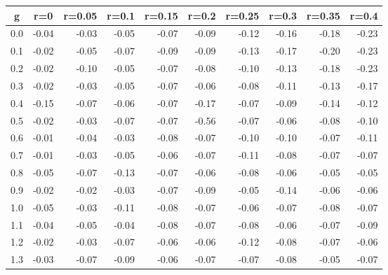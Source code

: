 %
\begin{table}[!tbp]
 \begin{center}
 \begin{tabular}{rrrrrrrrrr}\hline\hline
\multicolumn{1}{c}{g}&\multicolumn{1}{c}{r=0}&\multicolumn{1}{c}{r=0.05}&\multicolumn{1}{c}{r=0.1}&\multicolumn{1}{c}{r=0.15}&\multicolumn{1}{c}{r=0.2}&\multicolumn{1}{c}{r=0.25}&\multicolumn{1}{c}{r=0.3}&\multicolumn{1}{c}{r=0.35}&\multicolumn{1}{c}{r=0.4}\tabularnewline
\hline
0.0&-0.04&-0.03&-0.05&-0.07&-0.09&-0.12&-0.16&-0.18&-0.23\tabularnewline
0.1&-0.02&-0.05&-0.07&-0.09&-0.09&-0.13&-0.17&-0.20&-0.23\tabularnewline
0.2&-0.02&-0.10&-0.05&-0.07&-0.08&-0.10&-0.13&-0.18&-0.23\tabularnewline
0.3&-0.02&-0.03&-0.05&-0.07&-0.06&-0.08&-0.11&-0.13&-0.17\tabularnewline
0.4&-0.15&-0.07&-0.06&-0.07&-0.17&-0.07&-0.09&-0.14&-0.12\tabularnewline
0.5&-0.02&-0.03&-0.07&-0.07&-0.56&-0.07&-0.06&-0.08&-0.10\tabularnewline
0.6&-0.01&-0.04&-0.03&-0.08&-0.07&-0.10&-0.10&-0.07&-0.11\tabularnewline
0.7&-0.01&-0.03&-0.05&-0.06&-0.07&-0.11&-0.08&-0.07&-0.07\tabularnewline
0.8&-0.05&-0.07&-0.13&-0.07&-0.06&-0.08&-0.06&-0.05&-0.05\tabularnewline
0.9&-0.02&-0.02&-0.03&-0.07&-0.09&-0.05&-0.14&-0.06&-0.06\tabularnewline
1.0&-0.05&-0.03&-0.11&-0.08&-0.07&-0.06&-0.07&-0.08&-0.07\tabularnewline
1.1&-0.04&-0.05&-0.04&-0.08&-0.07&-0.08&-0.06&-0.07&-0.09\tabularnewline
1.2&-0.02&-0.03&-0.07&-0.06&-0.06&-0.12&-0.08&-0.07&-0.06\tabularnewline
1.3&-0.03&-0.07&-0.09&-0.06&-0.07&-0.07&-0.08&-0.05&-0.07\tabularnewline
\hline
\end{tabular}

\end{center}

\end{table}

